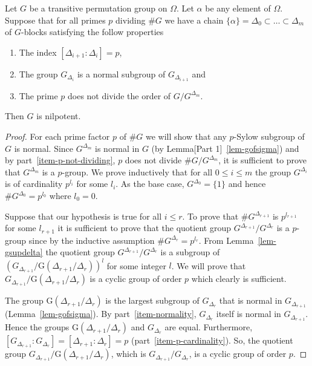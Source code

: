 \documentclass[prodmod,acmtalg]{acmsmall}
\newcommand{\Gof}[1]{{\ensuremath{\mathrm{G}\left(\scriptstyle #1\right)}}}
\begin{document}
\begin{theorem}\label{thm-g-is-nilpotent}
  Let $G$ be a transitive permutation group on $\Omega$. Let $\alpha$
  be any element of $\Omega$. Suppose that for all primes $p$ dividing
  $\# G$ we have a chain $\{ \alpha \} = \Delta_0 \subset \ldots
  \subset \Delta_m$ of $G$-blocks satisfying the follow properties
  \begin{enumerate}
  \item The index $[\Delta_{i+1}:\Delta_i] =
    p$,\label{item-p-cardinality}
  \item The group $G_{\Delta_i}$ is a normal subgroup of
    $G_{\Delta_{i+1}}$ and\label{item-normality}
  \item The prime $p$ does not divide the order of
    $G/G^{\Delta_m}$.\label{item-p-not-dividing}
  \end{enumerate}
  Then $G$ is nilpotent.
\end{theorem}

\begin{proof}
  For each prime factor $p$ of $\# G$ we will show that any $p$-Sylow
  subgroup of $G$ is normal.  Since $G^{\Delta_m}$ is normal in $G$
  (by Lemma[Part 1]~\ref{lem-gofsigma}) and by
  part~\ref{item-p-not-dividing}, $p$ does not divide
  $\#G/G^{\Delta_m}$, it is sufficient to prove that $G^{\Delta_m}$ is
  a $p$-group. We prove inductively that for all $0 \leq i \leq m$ the
  group $G^{\Delta_i}$ is of cardinality $p^{l_i}$ for some $l_i$. As
  the base case, $G^{\Delta_0} = \{ 1 \}$ and hence $\# G^{\Delta_0} =
  p^{l_0}$ where $l_0 = 0$.

  Suppose that our hypothesis is true for all $i \leq r$. To prove
  that $\# G^{\Delta_{r+1}}$ is $p^{l_{r+1}}$ for some $l_{r+1}$ it is
  sufficient to prove that the quotient group
  $G^{\Delta_{r+1}}/G^{\Delta_r}$ is a $p$-group since by the
  inductive assumption $\# G^{\Delta_r}= p^{l_r}$. {From}
  Lemma~\ref{lem-gsupdelta} the quotient group
  $G^{\Delta_{r+1}}/G^{\Delta_r}$ is a subgroup of
  $\left(G_{\Delta_{r+1}}/\Gof{\Delta_{r+1}/\Delta_r}\right)^l$ for
  some integer $l$. We will prove that
  $G_{\Delta_{r+1}}/\Gof{\Delta_{r+1}/\Delta_r}$ is a cyclic group of
  order $p$ which clearly is sufficient.

  The group $\Gof{\Delta_{r+1}/\Delta_r}$ is the largest subgroup of
  $G_{\Delta_r}$ that is normal in $G_{\Delta_{r+1}}$
  (Lemma~\ref{lem-gofsigma}). By part~\ref{item-normality},
  $G_{\Delta_r}$ itself is normal in $G_{\Delta_{r+1}}$. Hence the
  groups $\Gof{\Delta_{r+1}/\Delta_r}$ and $G_{\Delta_r}$ are
  equal. Furthermore, $[G_{\Delta_{r+1}}:G_{\Delta_r}] =
  [\Delta_{r+1}:\Delta_r] = p$ (part~\ref{item-p-cardinality}). So,
  the quotient group $G_{\Delta_{r+1}}/\Gof{\Delta_{r+1}/\Delta_r}$,
  which is $G_{\Delta_{r+1}}/G_{\Delta_r}$, is a cyclic group of order
  $p$.
\end{proof}
\end{document}
